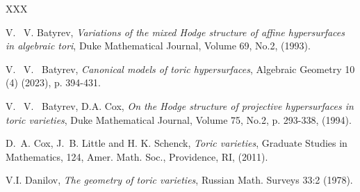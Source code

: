 \documentclass[12pt, english]{article}
\begin{document}

\begin{thebibliography}{XXX}
	
	
	
	 V. ~V. Batyrev, \emph{{Variations of the mixed Hodge structure of affine hypersurfaces in algebraic tori}}, Duke Mathematical Journal, Volume 69, No.2, (1993). 
	
	
	
	 V. \, V. \, Batyrev, \emph{{Canonical models of toric hypersurfaces}}, Algebraic Geometry 10 (4) (2023), p. 394-431.
	
	 V. \, V. \, Batyrev, D.A. Cox, \emph{{On the Hodge structure of projective hypersurfaces in toric varieties}}, Duke Mathematical Journal, Volume 75, No.2, p. 293-338, (1994).
	
	
	
	
	
	
	
	
	
	
	D.~A. Cox, J.~B. Little and H. K. Schenck,
	\emph{Toric varieties}, Graduate Studies in Mathematics, 124,
	Amer. Math. Soc., Providence, RI, (2011).
	
	 V.I. Danilov, \emph{{The geometry of toric varieties}}, Russian Math. Surveys 33:2 (1978).
		

\end{thebibliography}
\end{document}
